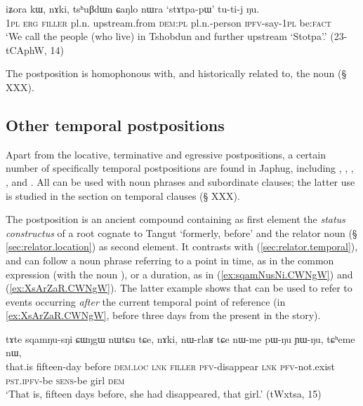  \begin{exe}
\ex \label{ex:TshuBdWn.CaNlo}
 \gll iʑora kɯ, nɤki, tsʰuβdɯn ɕaŋlo nɯra `stɤtpa-pɯ' tu-ti-j ŋu. \\
 \textsc{1pl} \textsc{erg} \textsc{filler} pl.n. upstream.from \textsc{dem}:\textsc{pl} pl.n.-person \textsc{ipfv}-say-\textsc{1pl} be:\textsc{fact} \\
\glt `We call the people (who live) in Tshobdun and further upstream `Stotpa'.' (23-tCAphW, 14)
\end{exe}

The postposition  is homophonous with, and historically related to, the noun  (§ XXX).
 
 \subsection{Other temporal postpositions} \label{sec:temporal.postpositions}
Apart from the locative, terminative and egressive postpositions, a certain number of specifically temporal postpositions are found in Japhug, including ,  , , ,  and . All can be used with noun phrases and subordinate clauses; the latter use is studied in the section on temporal clauses (§ XXX).

The postposition   is an ancient compound containing as first element the \textit{status constructus} of a root cognate to Tangut  `formerly, before' and the relator noun  (§ \ref{sec:relator.location}) as second element. It contrasts with   (\ref{sec:relator.temporal}), and can follow a noun phrase referring to a point in time, as in the common expression  (with the noun  ), or a duration, as in (\ref{ex:sqamNusNi.CWNgW}) and (\ref{ex:XsArZaR.CWNgW}). The latter example shows that  can be used to refer to events occurring \textit{after} the current temporal point of reference (in \ref{ex:XsArZaR.CWNgW}, before three days from the present in the story).

\begin{exe}
\ex \label{ex:sqamNusNi.CWNgW}
 \gll tɤte sqamŋu-sŋi ɕɯŋgɯ nɯtɕu tɕe, nɤki, nɯ-rlaʁ tɕe nɯ-me pɯ-ŋu ɲɯ-ŋu, tɕʰeme nɯ, \\
 that.is fifteen-day before \textsc{dem}.\textsc{loc} \textsc{lnk} \textsc{filler} \textsc{pfv}-disappear \textsc{lnk} \textsc{pfv}-not.exist \textsc{pst}.\textsc{ipfv}-be \textsc{sens}-be girl \textsc{dem} \\
 \glt `That is, fifteen days before, she had disappeared, that girl.' (tWxtsa, 15)
\end{exe}



